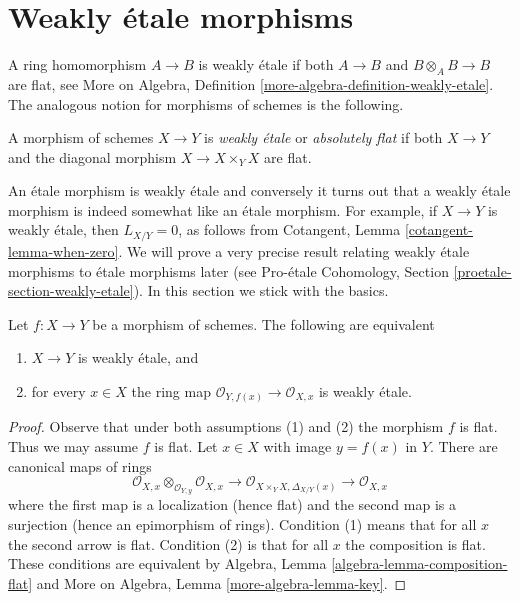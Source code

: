 









\section{Weakly \'etale morphisms}
\label{section-weakly-etale}

\noindent
A ring homomorphism $A \to B$ is weakly \'etale if both $A \to B$ and
$B \otimes_A B \to B$ are flat, see
More on Algebra, Definition \ref{more-algebra-definition-weakly-etale}.
The analogous notion for morphisms of schemes is the following.

\begin{definition}
\label{definition-weakly-etale}
A morphism of schemes $X \to Y$ is {\it weakly \'etale} or
{\it absolutely flat} if both $X \to Y$ and the diagonal
morphism $X \to X \times_Y X$ are flat.
\end{definition}

\noindent
An \'etale morphism is weakly \'etale and conversely
it turns out that a weakly \'etale morphism is indeed somewhat
like an \'etale morphism. For example, if $X \to Y$ is weakly
\'etale, then $L_{X/Y} = 0$, as follows from
Cotangent, Lemma \ref{cotangent-lemma-when-zero}.
We will prove a very precise result relating weakly \'etale
morphisms to \'etale morphisms later (see
Pro-\'etale Cohomology, Section \ref{proetale-section-weakly-etale}).
In this section we stick with the basics.

\begin{lemma}
\label{lemma-check-weakly-etale-stalks}
Let $f : X \to Y$ be a morphism of schemes. The following are equivalent
\begin{enumerate}
\item $X \to Y$ is weakly \'etale, and
\item for every $x \in X$ the ring map
$\mathcal{O}_{Y, f(x)} \to \mathcal{O}_{X, x}$ is weakly \'etale.
\end{enumerate}
\end{lemma}

\begin{proof}
Observe that under both assumptions (1) and (2) the morphism $f$ is flat.
Thus we may assume $f$ is flat. Let $x \in X$ with image $y = f(x)$ in $Y$.
There are canonical maps of rings
$$
\mathcal{O}_{X, x} \otimes_{\mathcal{O}_{Y, y}} \mathcal{O}_{X, x}
\longrightarrow
\mathcal{O}_{X \times_Y X, \Delta_{X/Y}(x)}
\longrightarrow
\mathcal{O}_{X, x}
$$
where the first map is a localization (hence flat) and the second map is a
surjection (hence an epimorphism of rings).
Condition (1) means that for all $x$ the second arrow is flat.
Condition (2) is that for all $x$ the composition is flat.
These conditions are equivalent by
Algebra, Lemma \ref{algebra-lemma-composition-flat} and
More on Algebra, Lemma \ref{more-algebra-lemma-key}.
\end{proof}

